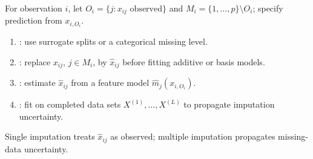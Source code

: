 \begin{remark} \label{rem:sl-missing-predictors-structured-learners} \\
For observation $i$, let $O_i=\{j:x_{ij}\text{ observed}\}$ and $M_i=\{1,\ldots,p\}\setminus O_i$; specify prediction from $x_{i,O_i}$.
\begin{enumerate}[label=(\roman*)]
\setlength{\itemsep}{0pt}
\item {}: use surrogate splits or a categorical missing level.
\item {}: replace $x_{ij}$, $j\in M_i$, by $\widehat x_{ij}$ before fitting additive or basis models.
\item {}: estimate $\widehat x_{ij}$ from a feature model $\widehat m_j(x_{i,O_i})$.
\item {}: fit on completed data sets $X^{(1)},\ldots,X^{(L)}$ to propagate imputation uncertainty.
\end{enumerate}
Single imputation treats $\widehat x_{ij}$ as observed; multiple imputation propagates missing-data uncertainty.
\end{remark}

